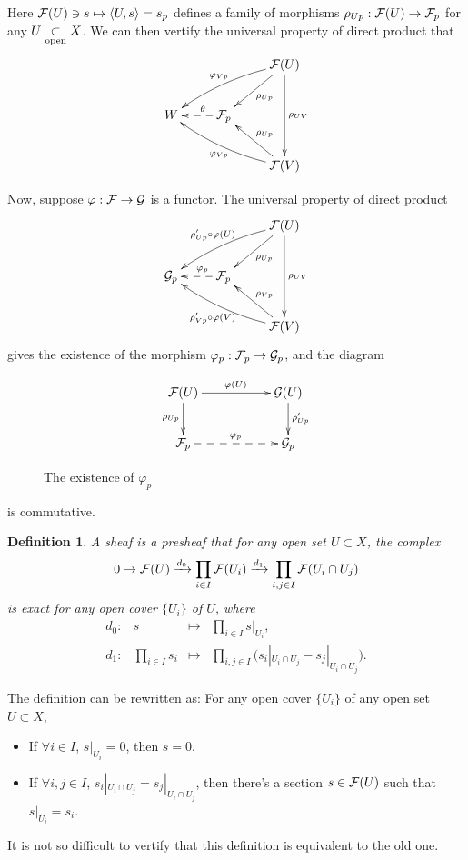 \documentclass[8pt]{article}
\theoremstyle{plain}
\newtheorem{defi}{Definition}
\begin{document}
Here $\mathcal{F}(U)\ni s\mapsto \langle U,s\rangle=s_p$ defines a family of morphisms $\rho_{Up}:\mathcal{F}(U)\to \mathcal{F}_p$ for any $U\underset{\mathrm{open}}{\subset} X$. We can then vertify the universal property of direct product that
\[
\begin{xy}
	\xymatrix{
	&&\ar[dl]^{\rho_{Up}}\calf(U)\ar[dd]^{\rho_{UV}}\ar@/_/[lld]_{\varphi_{Vp}} \\
	W&\ar@{-->}[l]_(0.4){\theta}\calf_p&\\
	&&\ar[ul]_{\rho_{Up}}\calf(V)\ar@/^/[llu]^{\varphi_{Vp}}
	}
\end{xy}
\]

Now, suppose $\varphi:\mathcal{F} \to \mathcal{G}$ is a functor. The universal property of direct product 
\[
	\begin{xy}
	\xymatrix{
		&&\ar[dl]^{\rho_{Up}}\calf(U)\ar[dd]^{\rho_{UV}}\ar@/_/[lld]_{\rho'_{Up}\circ\varphi(U)} \\
		\calg_p&\ar@{-->}[l]_(0.4){\varphi_p}\calf_p&\\
		&&\ar[ul]_{\rho_{Vp}}\calf(V)\ar@/^/[llu]^{\rho'_{Vp}\circ\varphi(V)}
	}
	\end{xy}
\]
gives the existence of the morphism $\varphi_p:\mathcal{F}_p\to \mathcal{G}_p$, and the diagram
\begin{figure}[h]
\[
\begin{xy}
	\xymatrix{
		\calf(U)\ar[rr]^{\varphi(U)} \ar[d]_{\rho_{Up}}&&\calg(U) \ar[d]^{\rho'_{Up}}\\
		\calf_p\ar@{-->}[rr]^{\varphi_p}&&\calg_p
	}
\end{xy}
\]
\caption{The existence of $\varphi_p$}
\label{fig1}
\end{figure}

\noindent is commutative.
\begin{defi}
	A sheaf is a presheaf that for any open set $U\subset X$, the complex 
\[
	0\rightarrow \mathcal{F}(U) \xrightarrow{d_0}\prod_{i\in I}\mathcal{F}(U_i) \xrightarrow{d_1}\prod_{i,j\in I}\mathcal{F}(U_i\cap U_j)
\]
is exact for any open cover $\{U_i\}$ of $U$, where
\[
\begin{array}{cccl}
	d_0:&s&\mapsto& \displaystyle{\prod_{i\in I}s|_{U_i}},\\
	d_1:&\displaystyle{\prod_{i\in I}s_i}&\mapsto& \displaystyle{\prod_{i,j\in I}\bigl(s_i|_{U_i\cap U_j}-s_j|_{U_i\cap U_j}\bigr)}.
\end{array}
\]
\end{defi}

The definition can be rewritten as: For any open cover $\{U_i\}$ of any open set $U\subset X$,
\begin{itemize}
\item If $\forall i\in I$, $s|_{U_i}=0$, then $s=0$.

\item If $\forall i,j\in I$, $s_i|_{U_i\cap U_j}=s_j|_{U_i\cap U_j}$, then there's a section $s\in\mathcal{F}(U)$ such that $s|_{U_i}=s_i$.
\end{itemize}
It is not so difficult to vertify that this definition is equivalent to the old one.
\end{document}
